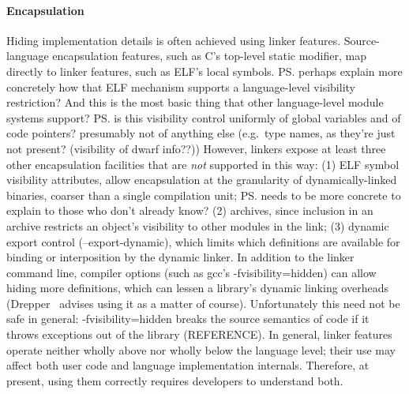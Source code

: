 
\paragraph{Encapsulation}
Hiding implementation details is often achieved using linker features. 
Source-language encapsulation features,
such as C's top-level \textsf{static} modifier, 
map directly to linker features, such as ELF's local symbols.
\ps{perhaps explain more concretely how that ELF mechanism supports
a language-level visibility restriction?   And this is the most basic
thing that other language-level module systems support?}
\ps{is this visibility control uniformly of global variables and of
  code pointers?  presumably not of anything else (e.g.~type names, as
  they're just not present?  (visibility of dwarf info??))}
However, linkers expose at least three other encapsulation facilities
that are \emph{not} supported in this way: (1) ELF symbol visibility attributes,
allow encapsulation at the granularity of dynamically-linked binaries, 
coarser than a single compilation unit; 
\ps{needs to be more concrete to explain to those who don't already know?}
(2) archives,
since inclusion in an archive restricts an object's visibility 
to other modules in the link;
(3) dynamic export control (\textsf{--export-dynamic}), which limits 
which definitions are available for binding or interposition by the dynamic linker.
In addition to the linker command line, 
compiler options (such as \textsf{gcc}'s \textsf{-fvisibility=hidden})
can allow hiding more definitions,
which can lessen a library's dynamic linking overheads
(Drepper~\citet{drepper} advises using it as a matter of course).
Unfortunately this need not be safe in general: \textsf{-fvisibility=hidden}
breaks the source semantics of \Cplusplus{} code if it throws exceptions 
out of the library (REFERENCE).
In general, linker features operate neither wholly above nor wholly below the language level; 
their use may affect both user code and language implementation internals.
Therefore, at present, using them correctly requires developers to understand both.


